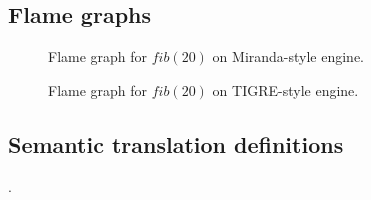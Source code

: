\documentclass[conference]{IEEEtran}
\begin{document}




\newpage
\appendix

\subsection{Flame graphs}
\label{app:flame-graph}
\begin{figure}
    
    \centering
    \caption{Flame graph for $fib(20)$ on Miranda-style engine.}
    \label{fig:flamegraph-turner}
\end{figure}

\begin{figure}
    
    \centering
    \caption{Flame graph for $fib(20)$ on TIGRE-style engine.}
    \label{fig:flamegraph-tigre}
\end{figure}

\FloatBarrier
\subsection{Semantic translation definitions}
\label{app:kiselyov}.
\end{document}
